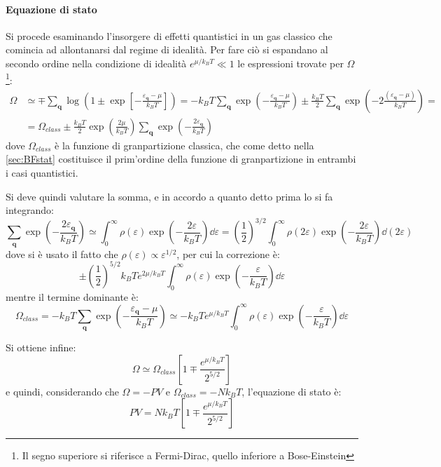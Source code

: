 \paragraph{Equazione di stato} Si procede esaminando l'insorgere di effetti quantistici in un gas classico che comincia ad allontanarsi dal regime di idealità. Per fare ciò si espandano al secondo ordine nella condizione di idealità $e^{\mu/k_B T} \ll 1$ le espressioni trovate per $\Omega$\footnote{Il segno superiore si riferisce a Fermi-Dirac, quello inferiore a Bose-Einstein}:
\begin{align*}
	\Omega &\simeq \mp \sum_{\textbf{q}} \log(1 \pm \exp[-\frac{\varepsilon_{\textbf{q}} - \mu}{k_B T}]) = -k_B T \sum_{\textbf{q}} \exp(-\frac{\varepsilon_{\textbf{q}} - \mu}{k_B T}) \pm \frac{k_B T}{2} \sum_{\textbf{q}} \exp(-2\frac{(\varepsilon_{\textbf{q}} - \mu)}{k_B T}) = \\
	&= \Omega_{class} \pm \frac{k_B T}{2} \exp(\frac{2\mu}{k_B T})\sum_{\textbf{q}} \exp(-\frac{2\varepsilon_{\textbf{q}} }{k_B T})
\end{align*}
dove $\Omega_{class}$ è la funzione di granpartizione classica, che come detto nella \cref{sec:BFstat} costituisce il prim'ordine della funzione di granpartizione in entrambi i casi quantistici.

Si deve quindi valutare la somma, e in accordo a quanto detto prima lo si fa integrando:
\begin{equation*}
\sum_{\textbf{q}} \exp(-\frac{2\varepsilon_{\textbf{q}} }{k_B T}) \simeq \int_0^{\infty} \rho(\varepsilon) \exp(-\frac{2\varepsilon }{k_B T}) \dd \varepsilon = \left(\frac{1}{2}\right)^{3/2 } \int_0^{\infty} \rho(2\varepsilon) \exp(-\frac{2\varepsilon }{k_B T}) \dd (2\varepsilon)
\end{equation*}
dove si è usato il fatto che $\rho(\varepsilon) \propto \varepsilon^{1/2}$, per cui la correzione è:
\begin{equation*}
\pm \left(\frac{1}{2}\right)^{5/2}k_B T e^{2\mu/k_B T}  \int_0^{\infty} \rho(\varepsilon) \exp(-\frac{\varepsilon }{k_B T}) \dd \varepsilon
\end{equation*}
mentre il termine dominante è:
\begin{equation*}
\Omega_{class} = -k_B T \sum_{\textbf{q}} \exp(-\frac{\varepsilon_{\textbf{q}} - \mu}{k_B T}) \simeq - k_B T e^{\mu/k_B T}  \int_0^{\infty} \rho(\varepsilon) \exp(-\frac{\varepsilon }{k_B T}) \dd \varepsilon
\end{equation*}

Si ottiene infine:
\begin{equation*}
	\Omega \simeq \Omega_{class}\left[1 \mp \frac{e^{\mu/k_B T}}{2^{5/2}}\right]
\end{equation*}
e quindi, considerando che $\Omega = - PV$ e $\Omega_{class} = - N k_B T$, l'equazione di stato è:
\begin{equation*}
	PV = N k_B T \left[1 \mp \frac{e^{\mu/k_B T}}{2^{5/2}}\right]
\end{equation*}

